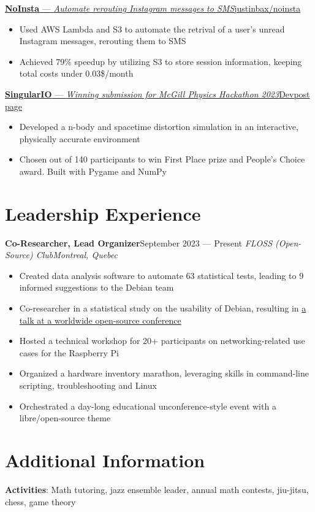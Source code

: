 \documentclass{article}
\newcommand{\newrole}[4]{
    {\normalfont\textbf{#1}\hfill#3}
    \newline
    \textit{#2}\hfill\textit{#4}
}
\newcommand{\shortlinkrole}[4]{
    {\href{#3}{\normalfont\textbf{#1} --- \textit{#2}\hfill#4\:\faExternalLink}\vspace*{-4pt}}
}
\newenvironment{bulletpoints}{\begin{itemize}\setlength\itemsep{-0.2em}}{\end{itemize}}
\begin{document}
\shortlinkrole{NoInsta}{Automate rerouting Instagram messages to SMS}{https://github.com/justinbax/brebeufhx}{justinbax/noinsta}
\begin{bulletpoints}
    \item Used AWS Lambda and S3 to automate the retrival of a user's unread Instagram messages, rerouting them to SMS
    \item Achieved 79\% speedup by utilizing S3 to store session information, keeping total costs under 0.03\$/month
\end{bulletpoints}

\shortlinkrole{SingularIO}{Winning submission for McGill Physics Hackathon 2023}{https://devpost.com/software/singulario}{Devpost page}
\begin{bulletpoints}
    \item Developed a n-body and spacetime distortion simulation in an interactive, physically accurate environment
    \item Chosen out of 140 participants to win First Place prize and People's Choice award. Built with Pygame and NumPy
\end{bulletpoints}


\section*{Leadership Experience}
\newrole{Co-Researcher, Lead Organizer}{FLOSS (Open-Source) Club}{September 2023 --- Present}{Montreal, Quebec}
\begin{bulletpoints}
    \item Created data analysis software to automate 63 statistical tests, leading to 9 informed suggestions to the Debian team
    \item Co-researcher in a statistical study on the usability of Debian, resulting in \href{https://debconf24.debconf.org/talks/49-debian-installer-usability-tests-take-2/}{a talk at a worldwide open-source conference}
    \item Hosted a technical workshop for 20+ participants on networking-related use cases for the Raspberry Pi
    \item Organized a hardware inventory marathon, leveraging skills in command-line scripting, troubleshooting and Linux
    \item Orchestrated a day-long educational unconference-style event with a libre/open-source theme
\end{bulletpoints}


\section*{Additional Information}
{\bfseries Activities}: Math tutoring, jazz ensemble leader, annual math contests, jiu-jitsu, chess, game theory
\end{document}

